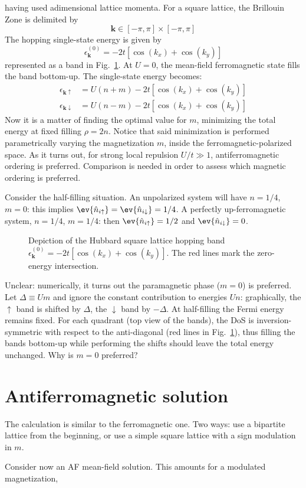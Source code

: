 having used adimensional lattice momenta. For a square lattice, the Brillouin Zone is delimited by
\[
	\mathbf{k} \in [-\pi,\pi] \times [-\pi,\pi]
\]
The hopping single-state energy is given by
\[
	\epsilon_{\mathbf{k}}^{(0)} = -2t \left[
		\cos(k_x) + \cos(k_y)
	\right]
\]
represented as a band in Fig.~\ref{appfig:ferromagnetic-3d-band}. At $U=0$, the mean-field ferromagnetic state fills the band bottom-up. The single-state energy becomes:
\[
\begin{aligned}
	\epsilon_{\mathbf{k}\uparrow} &= U \left(
		n+m
	\right) - 2t \left[
		\cos(k_x) + \cos(k_y)
	\right] \\
	\epsilon_{\mathbf{k}\downarrow} &= U \left(
		n-m
	\right) - 2t \left[
		\cos(k_x) + \cos(k_y)
	\right]
\end{aligned}
\]
Now it is a matter of finding the optimal value for $m$, minimizing the total energy at fixed filling $\rho = 2n$. Notice that said minimization is performed parametrically varying the magnetization $m$, inside the ferromagnetic-polarized space. As it turns out, for strong local repulsion $U/t \gg 1$, antiferromagnetic ordering is preferred. Comparison is needed in order to assess which magnetic ordering is preferred.

Consider the half-filling situation. An unpolarized system will have $n=1/4$, $m=0$: this implies $\ev{\hat n_{i\uparrow}} = \ev{\hat n_{i\downarrow}} = 1/4$. A perfectly up-ferromagnetic system, $n=1/4$, $m=1/4$: then $\ev{\hat n_{i\uparrow}} = 1/2$ and $\ev{\hat n_{i\downarrow}} = 0$. \todo

\begin{figure}
	\centering
	
	\caption{Depiction of the Hubbard square lattice hopping band $\epsilon_{\mathbf{k}}^{(0)} = -2t[\cos(k_x) + \cos(k_y)]$. The red lines mark the zero-energy intersection.}
	\label{appfig:ferromagnetic-3d-band}
\end{figure}

{\color{tabred} Unclear: numerically, it turns out the paramagnetic phase ($m=0$) is preferred. Let $\Delta \equiv Um$ and ignore the constant contribution to energies $Un$: graphically, the $\uparrow$ band is shifted by $\Delta$, the $\downarrow$ band by $-\Delta$. At half-filling the Fermi energy remains fixed. For each quadrant (top view of the bands), the DoS is inversion-symmetric with respect to the anti-diagonal (red lines in Fig.~\ref{appfig:ferromagnetic-3d-band}), thus filling the bands bottom-up while performing the shifts should leave the total energy unchanged. Why is $m=0$ preferred?}

\section{Antiferromagnetic solution}

{\color{tabred}The calculation is similar to the ferromagnetic one. Two ways: use a bipartite lattice from the beginning, or use a simple square lattice with a sign modulation in $m$.}

Consider now an AF mean-field solution. This amounts for a modulated magnetization,
